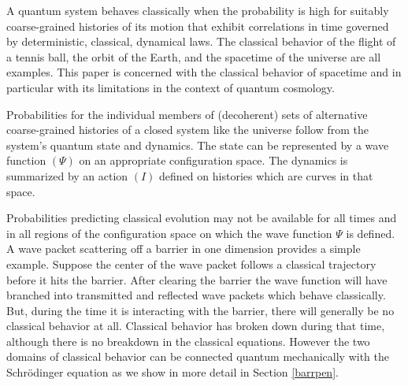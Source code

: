 \documentclass[prd,floats,superscriptaddress,eqsecnum,floatfix,nofootinbib,12pt]{revtex4}
\begin{document}
A quantum system behaves classically when the probability is high for suitably coarse-grained histories of its motion that exhibit correlations in time governed by deterministic, classical, dynamical laws. The classical behavior of the flight of a tennis ball, the orbit of the Earth, and the spacetime of the universe are all examples. This paper is concerned with the classical behavior of spacetime {and in particular with its limitations in the context of quantum cosmology}. 

Probabilities for the individual members of (decoherent) sets of alternative coarse-grained histories of a closed system like the universe follow from the system's quantum state and dynamics. The state can be represented by a wave function $(\Psi)$ on an appropriate configuration space. The dynamics is summarized by an action $(I)$ defined on histories which are curves in that space. 

{ Probabilities predicting
classical evolution} may not be available for all times and in all regions of the configuration space on which the wave function $\Psi$ is defined.  A wave packet scattering off a barrier in one dimension provides a simple example. Suppose the center of the wave packet follows a classical trajectory before it hits the barrier. After clearing the barrier the wave function will have branched into transmitted and reflected wave packets which behave classically. But, during the time it is interacting with the barrier, there will generally be no classical behavior at all. Classical behavior has broken down during that time, although there is no breakdown in the classical equations. However the two domains of classical behavior can be connected quantum mechanically with the Schr\"odinger equation as we show in more detail in Section \ref{barrpen}. 
\end{document}
